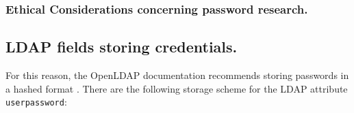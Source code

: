 
\subsubsection{Ethical Considerations concerning password research.}






\subsection{LDAP fields storing credentials.}

For this reason, the OpenLDAP documentation recommends storing passwords in a hashed format \cite{} . There are the following storage scheme for the LDAP attribute \texttt{userpassword}:

